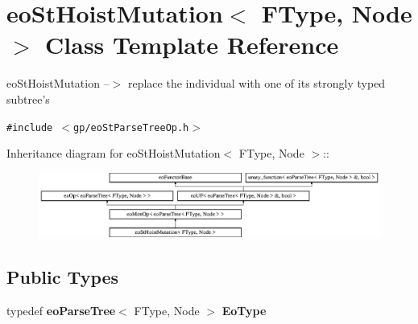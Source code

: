 \section{eo\-St\-Hoist\-Mutation$<$ FType, Node $>$ Class Template Reference}
\label{classeo_st_hoist_mutation}
eo\-St\-Hoist\-Mutation --$>$ replace the individual with one of its strongly typed subtree's  


{\tt \#include $<$gp/eo\-St\-Parse\-Tree\-Op.h$>$}

Inheritance diagram for eo\-St\-Hoist\-Mutation$<$ FType, Node $>$::\begin{figure}[H]
\begin{center}
\leavevmode
\includegraphics[height=2.14559cm]{classeo_st_hoist_mutation}
\end{center}
\end{figure}
\subsection*{Public Types}
\begin{CompactItemize}
\item 
typedef {\bf eo\-Parse\-Tree}$<$ FType, Node $>$ {\bf Eo\-Type}\label{classeo_st_hoist_mutation_w0}

\end{CompactItemize}
